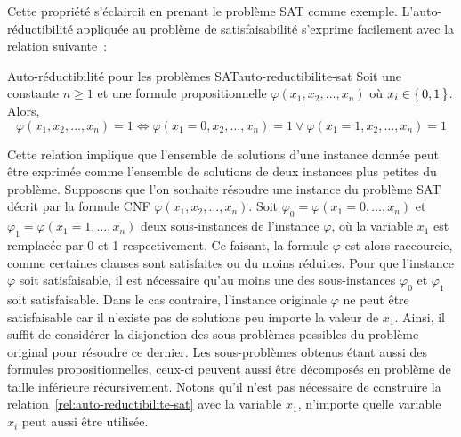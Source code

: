 Cette propriété s'éclaircit en prenant le problème SAT comme exemple. L'auto-réductibilité appliquée au problème de satisfaisabilité s'exprime facilement avec la relation suivante~\cite{hemaspaandraPowerSelfReducibilitySelectivity2020}:
\begin{relation}{Auto-réductibilité pour les problèmes SAT}{auto-reductibilite-sat}
    Soit une constante $n \geq 1$ et une formule propositionnelle $\varphi(x_{1}, x_{2}, \dots, x_{n})$ où $x_{i} \in \set{ 0, 1 }$. Alors,
    \begin{equation*}
        \varphi(x_{1}, x_{2}, \dots, x_{n}) = 1 \iff \varphi(x_{1}=0, x_{2}, \dots, x_{n}) = 1 \lor \varphi(x_{1}=1, x_{2}, \dots, x_{n}) = 1
    \end{equation*}
\end{relation}
Cette relation implique que l'ensemble de solutions d'une instance donnée peut être exprimée comme l'ensemble de solutions de deux instances plus petites du problème. Supposons que l'on souhaite résoudre une instance du problème SAT décrit par la formule CNF $\varphi(x_{1}, x_{2}, \dots, x_{n})$. Soit $\varphi_{0} = \varphi(x_{1}=0, \dots, x_{n})$ et $\varphi_{1} = \varphi(x_{1}=1, \dots, x_{n})$ deux sous-instances de l'instance $\varphi$, où la variable $x_{1}$ est remplacée par 0 et 1 respectivement. Ce faisant, la formule $\varphi$ est alors raccourcie, comme certaines clauses sont satisfaites ou du moins réduites. Pour que l'instance $\varphi$ soit satisfaisable, il est nécessaire qu'au moins une des sous-instances $\varphi_{0}$ et $\varphi_{1}$ soit satisfaisable. Dans le cas contraire, l'instance originale $\varphi$ ne peut être satisfaisable car il n'existe pas de solutions peu importe la valeur de $x_{1}$. Ainsi, il suffit de considérer la disjonction des sous-problèmes possibles du problème original pour résoudre ce dernier. Les sous-problèmes obtenus étant aussi des formules propositionnelles, ceux-ci peuvent aussi être décomposés en problème de taille inférieure récursivement. Notons qu'il n'est pas nécessaire de construire la relation~\ref{rel:auto-reductibilite-sat} avec la variable $x_{1}$, n'importe quelle variable $x_{i}$ peut aussi être utilisée. 



